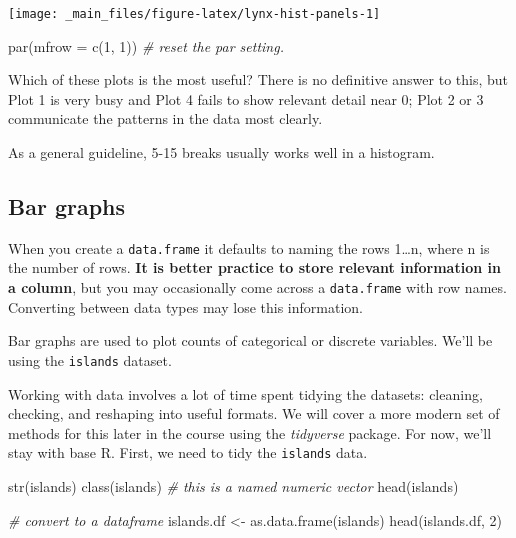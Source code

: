 \documentclass[
  11pt,
  a4paper,
]{book}
\newenvironment{Shaded}{\begin{snugshade}}{\end{snugshade}}
\newcommand{\AttributeTok}[1]{\textcolor[rgb]{0.77,0.63,0.00}{#1}}
\newcommand{\CommentTok}[1]{\textcolor[rgb]{0.56,0.35,0.01}{\textit{#1}}}
\newcommand{\DecValTok}[1]{\textcolor[rgb]{0.00,0.00,0.81}{#1}}
\newcommand{\FunctionTok}[1]{\textcolor[rgb]{0.00,0.00,0.00}{#1}}
\newcommand{\NormalTok}[1]{#1}
\newcommand{\OtherTok}[1]{\textcolor[rgb]{0.56,0.35,0.01}{#1}}
\begin{document}
\begin{center}\texttt{[image: \_main\_files/figure-latex/lynx-hist-panels-1]} \end{center}

\begin{Shaded}
\begin{Highlighting}[]
\FunctionTok{par}\NormalTok{(}\AttributeTok{mfrow =} \FunctionTok{c}\NormalTok{(}\DecValTok{1}\NormalTok{, }\DecValTok{1}\NormalTok{)) }\CommentTok{\# reset the par setting.}
\end{Highlighting}
\end{Shaded}

Which of these plots is the most useful? There is no definitive answer to this, but Plot 1 is very busy and Plot 4 fails to show relevant detail near 0; Plot 2 or 3 communicate the patterns in the data most clearly.

As a general guideline, 5-15 breaks usually works well in a histogram.

\hypertarget{bar-graphs}{%
\subsection{Bar graphs}\label{bar-graphs}}

When you create a \texttt{data.frame} it defaults to naming the rows 1\ldots n, where n is the number of rows. \textbf{It is better practice to store relevant information in a column}, but you may occasionally come across a \texttt{data.frame} with row names. Converting between data types may lose this information.

Bar graphs are used to plot counts of categorical or discrete variables. We'll be using the \texttt{islands} dataset.

Working with data involves a lot of time spent tidying the datasets: cleaning, checking, and reshaping into useful formats. We will cover a more modern set of methods for this later in the course using the \emph{tidyverse} package. For now, we'll stay with base R. First, we need to tidy the \texttt{islands} data.

\begin{Shaded}
\begin{Highlighting}[]
\FunctionTok{str}\NormalTok{(islands) }
\FunctionTok{class}\NormalTok{(islands) }\CommentTok{\# this is a named numeric vector}
\FunctionTok{head}\NormalTok{(islands)}

\CommentTok{\# convert to a dataframe}
\NormalTok{islands.df }\OtherTok{\textless{}{-}} \FunctionTok{as.data.frame}\NormalTok{(islands) }
\FunctionTok{head}\NormalTok{(islands.df, }\DecValTok{2}\NormalTok{)}
\end{Highlighting}
\end{Shaded}
\end{document}
